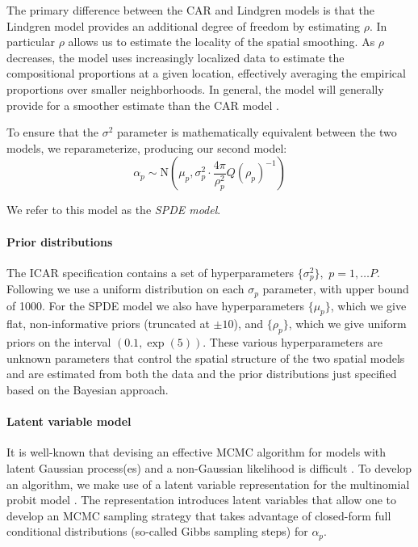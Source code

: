 \documentclass[10pt,letterpaper]{article}
\begin{document}
The primary difference between the CAR and Lindgren models is that
the Lindgren model provides an additional degree of freedom by estimating
$\rho$. In particular $\rho$ allows us to estimate the locality
of the spatial smoothing. As $\rho$ decreases, the
model uses increasingly localized data to estimate the compositional
proportions at a given location, effectively averaging the empirical
proportions over smaller neighborhoods. In general, the \cite{Lind:etal:2011}
model will generally provide for a smoother estimate than the CAR
model \cite{Paci:2013}. 

To ensure that the $\sigma^{2}$ parameter is mathematically equivalent
between the two models, we reparameterize, producing our second model:
\[
\alpha_{p}\sim\mbox{N}\left(\mu_{p},\sigma_{p}^{2}\cdot\frac{4\pi}{\rho_{p}^{2}}Q(\rho_{p})^{-1}\right)
\]


We refer to this model as the \emph{SPDE model}.



\paragraph*{Prior distributions}

\noindent The ICAR specification contains a set of hyperparameters
$\{\sigma_{p}^{2}\},$ $p=1,\ldots P$. Following \cite{Gelm:2006}
we use a uniform distribution on each $\sigma_{p}$ parameter, with
upper bound of 1000. For the SPDE model we also have hyperparameters
$\{\mu_{p}\}$, which we give flat, non-informative priors (truncated
at $\pm10$), and $\{\rho_{p}\}$, which we give uniform priors on
the interval $(0.1,\exp(5))$. These various hyperparameters
are unknown parameters that control the spatial structure of the two
spatial models and are estimated from both the data and the prior
distributions just specified based on the Bayesian approach.


\paragraph*{Latent variable model\label{sub:Latent-Variable-Model}}

It is well-known that devising an effective MCMC algorithm for models
with latent Gaussian process(es) and a non-Gaussian likelihood is
difficult \cite{Rue:Held:2005,Chri:etal:2006,Tan:Nott:2013}. To
develop an algorithm, we make use of a latent variable representation
for the multinomial probit model \cite{McCu:Ross:1994}. The representation
introduces latent variables that allow one to develop an MCMC sampling
strategy that takes advantage of closed-form full conditional distributions
(so-called Gibbs sampling steps) for $\alpha_{p}$.
\end{document}
